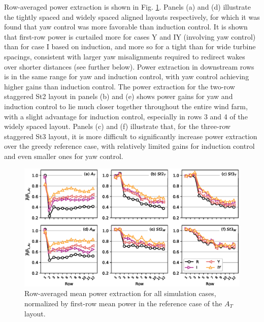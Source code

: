 \documentclass[a4paper]{jpconf}
\begin{document}
Row-averaged power extraction is shown in Fig. \ref{fig:power_row}. Panels (a) and (d) illustrate the tightly spaced and widely spaced aligned layouts respectively, for which it was found that yaw control was more favorable than induction control. It is shown that first-row power is curtailed more for cases Y and IY (involving yaw control) than for case I based on induction, and more so for a tight than for wide turbine spacings, consistent with larger yaw misalignments required to redirect wakes over shorter distances (see further below). Power extraction in downstream rows is in the same range for yaw and induction control, with yaw control achieving higher gains than induction control. The power extraction for the two-row staggered St2 layout in panels (b) and (e) shows power gains for yaw and induction control to lie much closer together throughout the entire wind farm, with a slight advantage for induction control, especially in rows 3 and 4 of the widely spaced layout. Panels (c) and (f) illustrate that, for the three-row staggered St3 layout, it is more difficult to significantly increase power extraction over the greedy reference case, with relatively limited gains for induction control and even smaller ones for yaw control. 

\begin{figure}
	\includegraphics[width=\textwidth]{Torque18/power_row}
	\caption{Row-averaged mean power extraction for all simulation cases, normalized by first-row mean power in the reference case of the $A_T$ layout.\label{fig:power_row}}
\end{figure}
\end{document}
